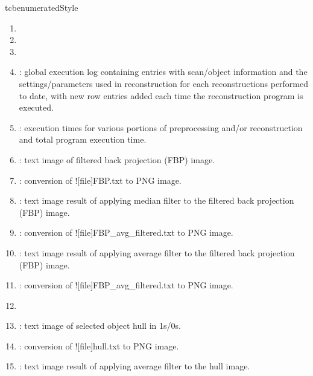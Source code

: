 \begin{tcbenvironment}
\begin{tcbparbox}{tcbenumeratedStyle}
\begin{enumerate}
    \item {}
    \item {}
    \item {}
    \item {} : global execution log containing entries with scan/object information and the settings/parameters used in reconstruction for each reconstructions performed to date, with new row entries added each time the reconstruction program is executed.
    \item {} : execution times for various portions of preprocessing and/or reconstruction and total program execution time.
    \item {} : text image of filtered back projection (FBP) image.
    \item {} : conversion of \docentry![file]{FBP.txt} to PNG image.
    \item {} : text image result of applying median filter to the filtered back projection (FBP) image.
    \item {} : conversion of \docentry![file]{FBP\_avg\_filtered.txt} to PNG image.
    \item {} : text image result of applying average filter to the filtered back projection (FBP) image.
    \item {} : conversion of \docentry![file]{FBP\_avg\_filtered.txt} to PNG image.
    \item {}
    \item {} : text image of selected object hull in 1s/0s.
    \item {} : conversion of \docentry![file]{hull.txt} to PNG image.
    \item {} : text image result of applying average filter to the hull image.

\end{enumerate}
\end{tcbparbox}
\end{tcbenvironment}
